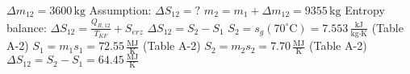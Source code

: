\( \Delta m_{12} = 3600 \, \text{kg} \)  
Assumption: \( \Delta S_{12} = ? \)  
\( m_2 = m_1 + \Delta m_{12} = 9355 \, \text{kg} \)  
Entropy balance: \( \Delta S_{12} = \frac{Q_{R,12}}{T_{KF}} + S_{erz} \)  
\( \Delta S_{12} = S_2 - S_1 \)  
\( S_2 = s_g (70^\circ \text{C}) = 7.553 \, \frac{\text{kJ}}{\text{kg·K}} \) (Table A-2)  
\( S_1 = m_1 s_1 = 72.55 \, \frac{\text{MJ}}{\text{K}} \) (Table A-2)  
\( S_2 = m_2 s_2 = 7.70 \, \frac{\text{MJ}}{\text{K}} \) (Table A-2)  
\( \Delta S_{12} = S_2 - S_1 = 64.45 \, \frac{\text{MJ}}{\text{K}} \)